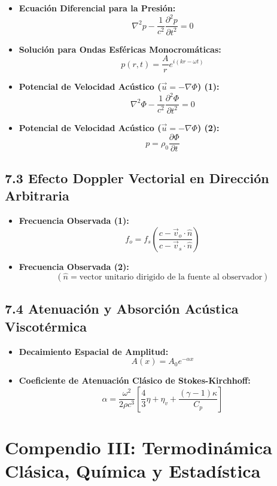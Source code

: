 \documentclass[11pt,a4paper]{article}
\begin{document}
\begin{itemize}
  \item \textbf{Ecuación Diferencial para la Presión:}
  \[
    \nabla^2 p - \frac{1}{c^2} \frac{\partial^2 p}{\partial t^2} = 0
  \]
  \item \textbf{Solución para Ondas Esféricas Monocromáticas:}
  \[
    p(r, t) = \frac{A}{r} e^{i(kr - \omega t)}
  \]
  \item \textbf{Potencial de Velocidad Acústico ($\vec{u} = -\nabla \Phi$) (1):}
  \[
    \nabla^2 \Phi - \frac{1}{c^2} \frac{\partial^2 \Phi}{\partial t^2} = 0
  \]
  \item \textbf{Potencial de Velocidad Acústico ($\vec{u} = -\nabla \Phi$) (2):}
  \[
    p = \rho_0 \frac{\partial \Phi}{\partial t}
  \]
\end{itemize}

\subsection*{7.3 Efecto Doppler Vectorial en Dirección Arbitraria}

\begin{itemize}
  \item \textbf{Frecuencia Observada (1):}
  \[
    f_o = f_s \left( \frac{c - \vec{v}_o \cdot \hat{n}}{c - \vec{v}_s \cdot \hat{n}} \right)
  \]
  \item \textbf{Frecuencia Observada (2):}
  \[
    (\hat{n} = \text{vector unitario dirigido de la fuente al observador})
  \]
\end{itemize}

\subsection*{7.4 Atenuación y Absorción Acústica Viscotérmica}

\begin{itemize}
  \item \textbf{Decaimiento Espacial de Amplitud:}
  \[
    A(x) = A_0 e^{-\alpha x}
  \]
  \item \textbf{Coeficiente de Atenuación Clásico de Stokes-Kirchhoff:}
  \[
    \alpha = \frac{\omega^2}{2\rho c^3} \left[ \frac{4}{3}\eta + \eta_v + \frac{(\gamma - 1)\kappa}{C_p} \right]
  \]
\end{itemize}

\section*{Compendio III: Termodinámica Clásica, Química y Estadística}
\end{document}
